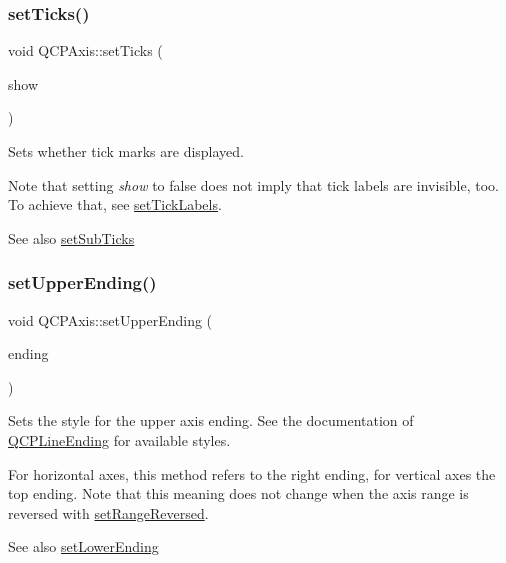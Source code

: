 \subsubsection{\texorpdfstring{setTicks()}{setTicks()}}
{\footnotesize\ttfamily void Q\+C\+P\+Axis\+::set\+Ticks (\begin{DoxyParamCaption}\item[{bool}]{show }\end{DoxyParamCaption})}

Sets whether tick marks are displayed.

Note that setting {\itshape show} to false does not imply that tick labels are invisible, too. To achieve that, see \mbox{\hyperlink{class_q_c_p_axis_a04ba16e1f6f78d70f938519576ed32c8}{set\+Tick\+Labels}}.

\begin{DoxySeeAlso}{See also}
\mbox{\hyperlink{class_q_c_p_axis_afa0ce8d4d0015ed23dcde01f8bc30106}{set\+Sub\+Ticks}} 
\end{DoxySeeAlso}
\mbox{\label{class_q_c_p_axis_a69119b892fc306f651763596685aa377}} 
\subsubsection{\texorpdfstring{setUpperEnding()}{setUpperEnding()}}
{\footnotesize\ttfamily void Q\+C\+P\+Axis\+::set\+Upper\+Ending (\begin{DoxyParamCaption}\item[{const \mbox{\hyperlink{class_q_c_p_line_ending}{Q\+C\+P\+Line\+Ending}} \&}]{ending }\end{DoxyParamCaption})}

Sets the style for the upper axis ending. See the documentation of \mbox{\hyperlink{class_q_c_p_line_ending}{Q\+C\+P\+Line\+Ending}} for available styles.

For horizontal axes, this method refers to the right ending, for vertical axes the top ending. Note that this meaning does not change when the axis range is reversed with \mbox{\hyperlink{class_q_c_p_axis_a2172fdb196b1a0dc3f40992fcad8e9e1}{set\+Range\+Reversed}}.

\begin{DoxySeeAlso}{See also}
\mbox{\hyperlink{class_q_c_p_axis_a08af1c72db9ae4dc8cb8a973d44405ab}{set\+Lower\+Ending}} 
\end{DoxySeeAlso}
\mbox{\label{class_q_c_p_axis_a57d9e961bae7d62f5b4e1f143e660c78}} 
